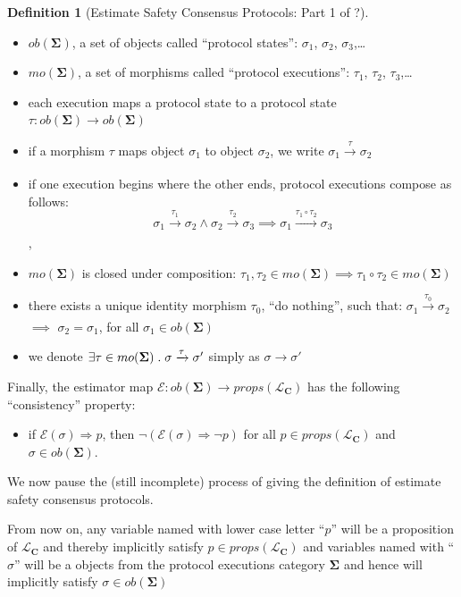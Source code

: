 \documentclass{article}
\theoremstyle{definition}
\newtheorem{defn}{Definition}[section]
\newcommand{\cat}{
	\mathbf
}
\begin{document}
\begin{defn}[Estimate Safety Consensus Protocols: Part 1 of ?]
\begin{description}
\begin{itemize}
\item $ob(\cat{\Sigma})$, a set of objects called ``protocol states'': $\sigma_1$, $\sigma_2$, $\sigma_3$,\ldots
\item $mo(\cat{\Sigma})$, a set of morphisms called ``protocol executions'': $\tau_1$, $\tau_2$, $\tau_3$,\ldots
\item each execution maps a protocol state to a protocol state $\tau:ob(\cat{\Sigma}) \to ob(\cat{\Sigma})$
\item if a morphism $\tau$ maps object $\sigma_1$ to object $\sigma_2$, we write $\sigma_1 \xrightarrow[]{\tau} \sigma_2$
\item if one execution begins where the other ends, protocol executions compose as follows:
$$\sigma_1 \xrightarrow[]{\tau_1} \sigma_2 \land \sigma_2 \xrightarrow[]{\tau_2} \sigma_3 \implies \sigma_1 \xrightarrow[]{\tau_1 \circ \tau_2} \sigma_3$$,
\item $mo(\cat{\Sigma})$ is closed under composition: $\tau_1, \tau_2 \in mo(\cat{\Sigma}) \implies \tau_1 \circ \tau_2 \in mo(\cat{\Sigma})$
\item there exists a unique identity morphism $\tau_0$, ``do nothing'', such that: $\sigma_1 \xrightarrow[]{\tau_0} \sigma_2$ $\implies$ $\sigma_2 = \sigma_1$, for all $\sigma_1 \in ob(\cat{\Sigma})$
\item we denote $\exists \tau \in mo(\cat{\Sigma}) \hspace{1mm} . \hspace{1mm} \sigma \xrightarrow[]{\tau} \sigma'$ simply as $\sigma \to \sigma'$
\end{itemize}


Finally, the estimator map $\mathcal{E}: ob(\cat{\Sigma}) \to props(\mathcal{L}_\cat{C})$ has the following ``consistency'' property:
\begin{itemize}
\item if $\mathcal{E}(\sigma) \Rightarrow p$, then $\neg{(\mathcal{E}(\sigma) \Rightarrow \neg p)}$ for all $p \in props(\mathcal{L}_\cat{C})$ and $\sigma \in ob(\cat{\Sigma})$.
\end{itemize}

We now pause the (still incomplete) process of giving the definition of estimate safety consensus protocols.
\end{description}
\end{defn}


From now on, any variable named with lower case letter ``$p$'' will be a proposition of $\mathcal{L}_\cat{C}$ and thereby implicitly satisfy $p \in props(\mathcal{L}_\cat{C})$ and variables named with ``$\sigma$'' will be a objects from the protocol executions category $\cat{\Sigma}$ and hence will implicitly satisfy $\sigma \in ob(\cat{\Sigma})$
\end{document}
